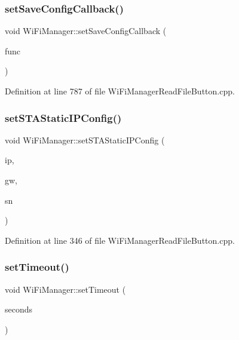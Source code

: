 \subsubsection{\texorpdfstring{set\+Save\+Config\+Callback()}{setSaveConfigCallback()}}
{\footnotesize\ttfamily void Wi\+Fi\+Manager\+::set\+Save\+Config\+Callback (\begin{DoxyParamCaption}\item[{void($\ast$)(void)}]{func }\end{DoxyParamCaption})}



Definition at line 787 of file Wi\+Fi\+Manager\+Read\+File\+Button.\+cpp.

\mbox{\label{class_wi_fi_manager_a124d89536d0ba5b5bd117e6c44a53e8d}} 
\subsubsection{\texorpdfstring{set\+S\+T\+A\+Static\+I\+P\+Config()}{setSTAStaticIPConfig()}}
{\footnotesize\ttfamily void Wi\+Fi\+Manager\+::set\+S\+T\+A\+Static\+I\+P\+Config (\begin{DoxyParamCaption}\item[{I\+P\+Address}]{ip,  }\item[{I\+P\+Address}]{gw,  }\item[{I\+P\+Address}]{sn }\end{DoxyParamCaption})}



Definition at line 346 of file Wi\+Fi\+Manager\+Read\+File\+Button.\+cpp.

\mbox{\label{class_wi_fi_manager_aa6493d59c284ff245edb767ff684756d}} 
\subsubsection{\texorpdfstring{set\+Timeout()}{setTimeout()}}
{\footnotesize\ttfamily void Wi\+Fi\+Manager\+::set\+Timeout (\begin{DoxyParamCaption}\item[{unsigned long}]{seconds }\end{DoxyParamCaption})}



